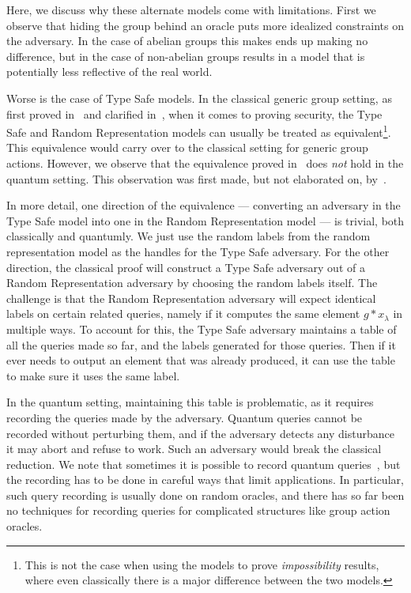 \documentclass{article}\usepackage[a4paper,margin=20mm]{geometry}
\numberwithin{theorem}{section}
\numberwithin{equation}{section}
\begin{document}
Here, we discuss why these alternate models come with limitations. First we observe that hiding the group behind an oracle puts more idealized constraints on the adversary. In the case of abelian groups this makes ends up making no difference, but in the case of non-abelian groups results in a model that is potentially less reflective of the real world.

Worse is the case of Type Safe models. In the classical generic group setting, as first proved in~\cite{PROVSEC:JagSch08} and clarified in~\cite{C:Zhandry22b}, when it comes to proving security, the Type Safe and Random Representation models can usually be treated as equivalent\footnote{This is not the case when using the models to prove \emph{impossibility} results, where even classically there is a major difference between the two models.}. This equivalence would carry over to the classical setting for generic group actions. However, we observe that the equivalence proved in~\cite{PROVSEC:JagSch08,C:Zhandry22b} does \emph{not} hold in the quantum setting. This observation was first made, but not elaborated on, by~\cite{DBLP:conf/crypto/HhanYY24}.

In more detail, one direction of the equivalence --- converting an adversary in the Type Safe model into one in the Random Representation model --- is trivial, both classically and quantumly. We just use the random labels from the random representation model as the handles for the Type Safe adversary. For the other direction, the classical proof will construct a Type Safe adversary out of a Random Representation adversary by choosing the random labels itself. The challenge is that the Random Representation adversary will expect identical labels on certain related queries, namely if it computes the same element $g*x_\lambda$ in multiple ways. To account for this, the Type Safe adversary maintains a table of all the queries made so far, and the labels generated for those queries. Then if it ever needs to output an element that was already produced, it can use the table to make sure it uses the same label.

In the quantum setting, maintaining this table is problematic, as it requires recording the queries made by the adversary. Quantum queries cannot be recorded without perturbing them, and if the adversary detects any disturbance it may abort and refuse to work. Such an adversary would break the classical reduction. We note that sometimes it is possible to record quantum queries~\cite{C:Zhandry19}, but the recording has to be done in careful ways that limit applications. In particular, such query recording is usually done on random oracles, and there has so far been no techniques for recording queries for complicated structures like group action oracles.
\end{document}

